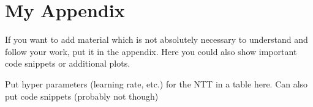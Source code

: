\chapter{My Appendix}
\label{app:a}

If you want to add material which is not absolutely necessary to understand and
follow your work, put it in the appendix. Here you could also show important
code snippets or additional plots.

Put hyper parameters (learning rate, etc.)  for the NTT in a table here.
Can also put code snippets (probably not though) 
